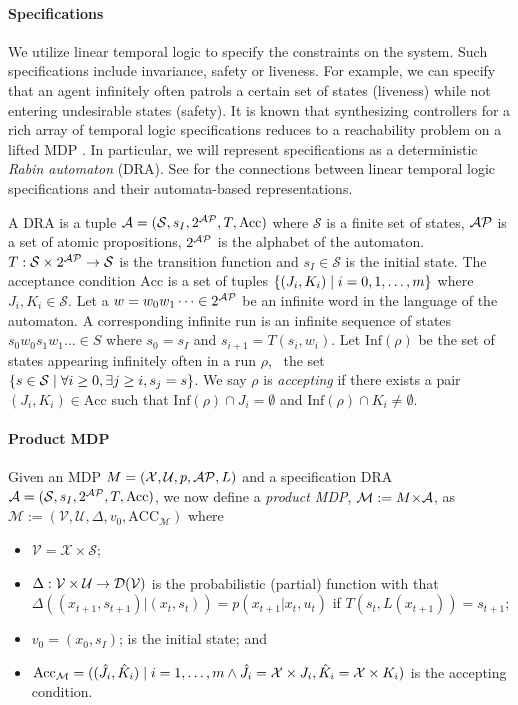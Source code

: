
\paragraph*{Specifications} We utilize linear temporal logic to specify the constraints on the system. Such specifications include invariance, safety or liveness. For example, we can specify that an agent infinitely often patrols a certain set of states (liveness) while not entering undesirable states (safety). It is known that synthesizing controllers for a rich array of temporal logic specifications reduces to a reachability problem on a lifted MDP \cite{BaierKatoen08}. In particular, we will represent specifications as a deterministic \emph{Rabin automaton} (DRA). See \cite{BaierKatoen08,safra1988complexity} for the connections between linear temporal logic specifications and their automata-based representations. 

A DRA is a tuple $\mathcal{A} = (\mathcal{S},s_I,2^{\mathcal{AP}}, T,\textrm{Acc})$ where $\mathcal{S}$ is a finite set of states, $\mathcal{AP}$ is a set of atomic propositions, $2^{\mathcal{AP}}$ is the alphabet of the automaton. $T: \mathcal{S} \times 2^{\mathcal{AP}} \rightarrow \mathcal{S} $ is the transition function and $s_I \in \mathcal{S}$ is the initial state. The acceptance condition $\textrm{Acc}$ is a set of tuples $\{(J_i,K_i) \mathrel{\mid} i= 0,1,\dots,m \}$ where $J_i,K_i \in \mathcal{S}$. Let a $w = w_0 w_1 \dots \in 2^{\mathcal{AP}}$ be an infinite word in the language of the automaton. A corresponding infinite run is an infinite sequence of states $s_0 w_0 s_1 w_1 \dots \in S$ where $s_0 = s_I$ and $s_{i+1} = T(s_i,w_i)$. Let $\textrm{Inf}(\rho)$ be the set of states appearing infinitely often in a run $\rho$, \ie~the set $\{s \in \mathcal{S} \mathrel{\mid} \forall i \ge 0, \exists j \ge i, s_j = s\}$. We say $\rho$ is \emph{accepting} if there exists a pair $(J_i,K_i) \in \textrm{Acc}$ such that $\textrm{Inf}(\rho) \cap J_i = \emptyset$ and $\textrm{Inf}(\rho) \cap K_i \neq \emptyset$.

\paragraph*{Product MDP}
Given an MDP $M=(\mathcal{X},\mathcal{U},p,\mathcal{AP},L)$ and a specification DRA
$\mathcal{A} = (\mathcal{S},s_I,2^{\mathcal{AP}}, T,\textrm{Acc})$, we now define a \emph{product
MDP}, $\mathcal{M} := M \mathcal{\times A}$, as $\mathcal{M}
:= (\mathcal{V},\mathcal{U}, \Delta,v_0,\textrm{ACC}_{\mathcal{M}})$ where
\begin{itemize}
	\item $\mathcal{V} = \mathcal{X} \times \mathcal{S}$;
	\item $\Delta: \mathcal{V} \times \mathcal{U} \rightarrow \mathcal{D}(\mathcal{V})$ is the probabilistic
		(partial) function with
		that $\Delta\left((x_{t+1},s_{t+1})\vert (x_t,s_t)\right) = p(x_{t+1} \vert x_t,u_t ) $ if $T(s_t,L(x_{t+1}))
		= s_{t+1}$;
	\item $v_0 = (x_0,s_I)$; is the initial state; and
	\item $\textrm{Acc}_{\mathcal{M}} =
		((\hat{J}_i,\hat{K}_i) \mathrel{\mid} i = 1,\dots,m \land \hat{J}_i = \mathcal{X}
		\times J_i,\hat{K}_i = \mathcal{X} \times K_i)$ is the accepting condition.
\end{itemize}

